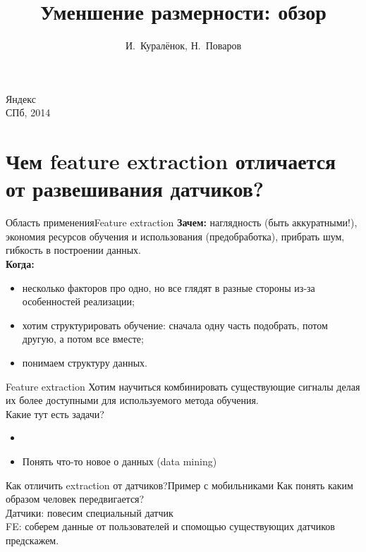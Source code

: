 \documentclass[14pt, fleqn, xcolor={dvipsnames, table}]{beamer}
\title{Уменшение размерности: обзор\\\small{}}
\author[]{\small{%
И.~Куралёнок,
Н.~Поваров}}
\date{}
\begin{document}
\begin{frame}
\maketitle
\small
\begin{center}
\vspace{-60pt}
\normalsize {\color{red}Я}ндекс \\
\vspace{80pt}
\footnotesize СПб, 2014
\end{center}
\end{frame}
\section{Чем feature extraction отличается от развешивания датчиков?}

\begin{frame}{Область применения}{Feature extraction}
\textbf{Зачем:} наглядность (быть аккуратными!), экономия ресурсов обучения и использования (предобработка), прибрать шум, гибкость в построении данных. \\
\textbf{Когда:}
\begin{itemize}
  \item несколько факторов про одно, но все глядят в разные стороны из-за особенностей реализации;
  \item хотим структурировать обучение: сначала одну часть подобрать, потом другую, а потом все вместе;
  \item понимаем структуру данных.
\end{itemize}
\end{frame}

\begin{frame}{Feature extraction}
Хотим научиться комбинировать существующие сигналы делая их более доступными для используемого метода обучения.\\
Какие тут есть задачи?
\begin{itemize}
  \item {}
  \item Понять что-то новое о данных (data mining)
\end{itemize}
\end{frame}

\begin{frame}{Как отличить extraction от датчиков?}{Пример с мобильниками}
Как понять каким образом человек передвигается?\\
{\color{blue} Датчики:} повесим специальный датчик \\
{\color{blue} FE:} соберем данные от пользователей и спомощью существующих датчиков предскажем.
\end{frame}
\end{document}

